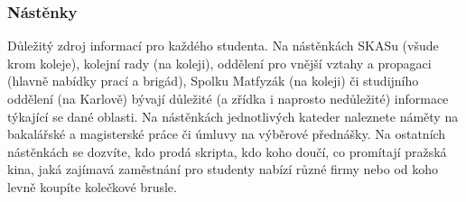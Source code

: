 \subsubsection{Nástěnky}
Důležitý zdroj informací pro každého studenta. Na nástěnkách SKASu (všude krom
koleje), kolejní rady (na koleji), oddělení pro vnější vztahy a propagaci
(hlavně nabídky prací a brigád), Spolku Matfyzák (na koleji) či studijního
oddělení (na Karlově) bývají důležité (a zřídka i naprosto nedůležité) informace
týkající se dané oblasti. Na nástěnkách jednotlivých kateder naleznete náměty na
bakalářské a magisterské práce či úmluvy na výběrové přednášky. Na ostatních
nástěnkách se dozvíte, kdo prodá skripta, kdo koho doučí, co promítají pražská
kina, jaká zajímavá zaměstnání pro studenty nabízí různé firmy nebo od koho
levně koupíte kolečkové brusle.


